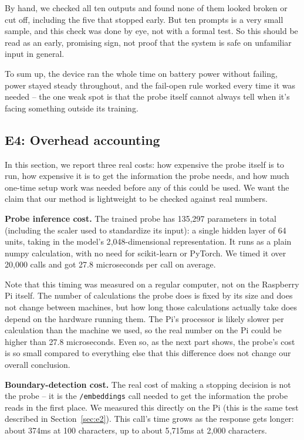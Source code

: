 \documentclass[review,12pt]{elsarticle}
\begin{document}
By hand, we checked all ten outputs and found none of them looked
broken or cut off, including the five that stopped early. But ten
prompts is a very small sample, and this check was done by eye, not
with a formal test. So this should be read as an early, promising sign,
not proof that the system is safe on unfamiliar input in general.

To sum up, the device ran the whole time on battery power without
failing, power stayed steady throughout, and the fail-open rule worked
every time it was needed -- the one weak spot is that the probe itself
cannot always tell when it's facing something outside its training.

\subsection{E4: Overhead accounting}
In this section, we report three real costs: how expensive the probe itself is to
run, how expensive it is to get the information the probe needs, and
how much one-time setup work was needed before any of this could be
used. We want the claim that our method is lightweight to be checked
against real numbers.

\textbf{Probe inference cost.} The trained probe has 135{,}297
parameters in total (including the scaler used to standardize its
input): a single hidden layer of 64 units, taking in the model's
2{,}048-dimensional representation. It runs as a plain numpy
calculation, with no need for scikit-learn or PyTorch. We timed it over
20{,}000 calls and got 27.8 microseconds per call on average.

Note that this timing was measured on a
regular computer, not on the Raspberry Pi itself. The number of
calculations the probe does is fixed by its size and does not change
between machines, but how long those calculations actually take does
depend on the hardware running them. The Pi's processor is likely
slower per calculation than the machine we used, so the real number on
the Pi could be higher than 27.8 microseconds. Even so, as the next
part shows, the probe's cost is so small compared to everything else
that this difference does not change our overall conclusion.

\textbf{Boundary-detection cost.} The real cost of making a stopping
decision is not the probe -- it is the \texttt{/embeddings} call needed
to get the information the probe reads in the first place. We measured
this directly on the Pi (this is the same test described in
Section~\ref{sec:e2}). This
call's time grows as the response gets longer: about 374ms at 100
characters, up to about 5{,}715ms at 2{,}000 characters.
\end{document}
